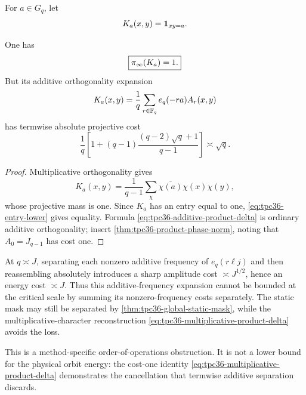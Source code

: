 For \(a\in G_q\), let
\begin{equation}
 K_a(x,y)=\mathbf 1_{xy=a}.
 \label{eq:tpc36-product-permutation-kernel}
\end{equation}

\begin{proposition}
\label{prop:tpc36-product-kernel-cost}
One has
\begin{equation}
 \boxed{\pi_{\infty}(K_a)=1.}
 \label{eq:tpc36-product-kernel-projective-cost}
\end{equation}
But its additive orthogonality expansion
\begin{equation}
 K_a(x,y)=\frac1q\sum_{r\in\mathbb F_q}e_q(-ra)A_r(x,y)
 \label{eq:tpc36-additive-product-delta}
\end{equation}
has termwise absolute projective cost
\begin{equation}
 \frac1q\left[
 1+(q-1)\frac{(q-2)\sqrt q+1}{q-1}
 \right]
 \asymp\sqrt q.
 \label{eq:tpc36-additive-reassembly-cost}
\end{equation}
\end{proposition}

\begin{proof}
Multiplicative orthogonality gives
\begin{equation}
 K_a(x,y)=\frac1{q-1}\sum_\chi
 \overline{\chi(a)}\chi(x)\chi(y),
 \label{eq:tpc36-multiplicative-product-delta}
\end{equation}
whose projective mass is one.  Since \(K_a\) has an entry equal to one,
\eqref{eq:tpc36-entry-lower} gives equality.  Formula
\eqref{eq:tpc36-additive-product-delta} is ordinary additive
orthogonality; insert \cref{thm:tpc36-product-phase-norm}, noting that
\(A_0=J_{q-1}\) has cost one.
\end{proof}

\begin{corollary}
\label{cor:tpc36-retain-product-slope}
At \(q\asymp J\), separating each nonzero additive frequency of
\(e_q(r\ell j)\) and then reassembling absolutely introduces a sharp
amplitude cost \(\asymp J^{1/2}\), hence an energy cost \(\asymp J\).
Thus this additive-frequency expansion cannot be bounded at the critical
scale by summing its nonzero-frequency costs separately.  The static mask
may still be separated by \cref{thm:tpc36-global-static-mask}, while the
multiplicative-character reconstruction
\eqref{eq:tpc36-multiplicative-product-delta} avoids the loss.
\end{corollary}

This is a method-specific order-of-operations obstruction.  It is not a
lower bound for the physical orbit energy: the cost-one identity
\eqref{eq:tpc36-multiplicative-product-delta} demonstrates the cancellation
that termwise additive separation discards.
